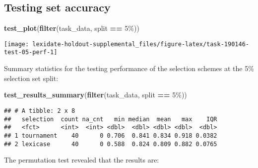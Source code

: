 \documentclass[
]{book}
\newenvironment{Shaded}{\begin{snugshade}}{\end{snugshade}}
\newcommand{\AttributeTok}[1]{\textcolor[rgb]{0.13,0.29,0.53}{#1}}
\newcommand{\DecValTok}[1]{\textcolor[rgb]{0.00,0.00,0.81}{#1}}
\newcommand{\FunctionTok}[1]{\textcolor[rgb]{0.13,0.29,0.53}{\textbf{#1}}}
\newcommand{\NormalTok}[1]{#1}
\newcommand{\OtherTok}[1]{\textcolor[rgb]{0.56,0.35,0.01}{#1}}
\newcommand{\SpecialCharTok}[1]{\textcolor[rgb]{0.81,0.36,0.00}{\textbf{#1}}}
\newcommand{\StringTok}[1]{\textcolor[rgb]{0.31,0.60,0.02}{#1}}
\begin{document}
\hypertarget{testing-set-accuracy-15}{%
\subsection{Testing set accuracy}\label{testing-set-accuracy-15}}

\begin{Shaded}
\begin{Highlighting}[]
\FunctionTok{test\_plot}\NormalTok{(}\FunctionTok{filter}\NormalTok{(task\_data, split }\SpecialCharTok{==} \StringTok{\textquotesingle{}5\%\textquotesingle{}}\NormalTok{))}
\end{Highlighting}
\end{Shaded}

\texttt{[image: lexidate-holdout-supplemental\_files/figure-latex/task-190146-test-05-perf-1]}

Summary statistics for the testing performance of the selection schemes at the 5\% selection set split:

\begin{Shaded}
\begin{Highlighting}[]
\FunctionTok{test\_results\_summary}\NormalTok{(}\FunctionTok{filter}\NormalTok{(task\_data, split }\SpecialCharTok{==} \StringTok{\textquotesingle{}5\%\textquotesingle{}}\NormalTok{))}
\end{Highlighting}
\end{Shaded}

\begin{verbatim}
## # A tibble: 2 x 8
##   selection  count na_cnt   min median  mean   max    IQR
##   <fct>      <int>  <int> <dbl>  <dbl> <dbl> <dbl>  <dbl>
## 1 tournament    40      0 0.706  0.841 0.834 0.918 0.0382
## 2 lexicase      40      0 0.588  0.824 0.809 0.882 0.0765
\end{verbatim}

The permutation test revealed that the results are:

\begin{Shaded}
\end{Shaded}
\end{document}
